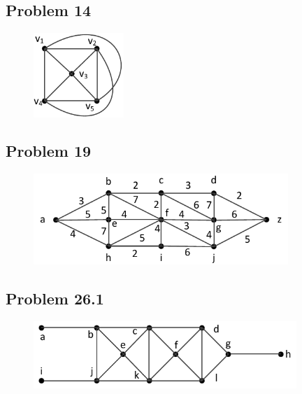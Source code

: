 \documentclass[
        handout,
        ]{beamer}
\begin{document}
    \subsection{Problem 14}
        \begin{frame}[c]{\subsecname}
                \begin{figure}
                    \centering
                    \includegraphics[width=34mm]{tut11p13_1}
                \end{figure}
        \end{frame}
    \subsection{Problem 19}
        \begin{frame}[c]{\subsecname}
            \begin{figure}
                \centering
                \includegraphics[width=96.3mm]{tut11p17_1}
            \end{figure}
        \end{frame}
    \subsection{Problem 26.1}
        \begin{frame}[c]{\subsecname}
            \begin{figure}
                \centering
                \includegraphics[width=99.6mm]{tut11p23_1_1}
            \end{figure}
        \end{frame}
\end{document}
